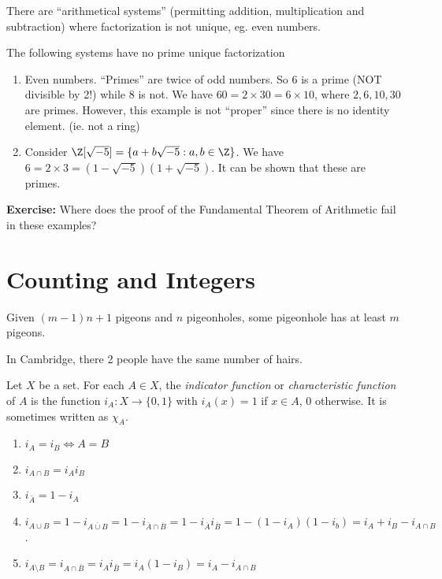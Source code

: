 \documentclass[a4paper]{article}
\begin{document}
  \note There are ``arithmetical systems'' (permitting addition, multiplication and subtraction) where factorization is not unique, eg. even numbers.

  \begin{eg}
    The following systems have no prime unique factorization
    \begin{enumerate}
      \item Even numbers. ``Primes'' are twice of odd numbers. So 6 is a prime (NOT divisible by 2!) while 8 is not. We have $60 = 2\times 30 = 6\times 10$, where $2, 6, 10, 30$ are primes. However, this example is not ``proper'' since there is no identity element. (ie. not a ring)
      \item Consider $\Z[\sqrt{-5}] = \{a + b\sqrt{-5} : a, b\in \Z\}$. We have $6 = 2\times 3 = (1 - \sqrt{-5})(1 + \sqrt{-5})$. It can be shown that these are primes.
    \end{enumerate}
  \end{eg}
  \noindent\textbf{Exercise:} Where does the proof of the Fundamental Theorem of Arithmetic fail in these examples?

  \section{Counting and Integers}
  \begin{thm}
    Given $(m - 1)n + 1$ pigeons and $n$ pigeonholes, some pigeonhole has at least $m$ pigeons.
  \end{thm}

  \begin{eg}
    In Cambridge, there 2 people have the same number of hairs.
  \end{eg}

  \begin{defi}
    Let $X$ be a set. For each $A\in X$, the \emph{indicator function} or \emph{characteristic function} of $A$ is the function $i_A: X\to \{0, 1\}$ with $i_A(x) = 1$ if $x\in A$, $0$ otherwise. It is sometimes written as $\chi_A$. 
  \end{defi}
  \begin{prop}\leavevmode
    \begin{enumerate}
      \item $i_A = i_B \Leftrightarrow A = B$
      \item $i_{A\cap B} = i_A i_B$
      \item $i_{\bar{A}} = 1 - i_A$
      \item $i_{A\cup B} = 1 - i_{\overline{A\cup B}}  = 1 - i_{\bar A\cap \bar B} = 1 - i_{\bar{A}}i_{\bar{B}} = 1 - (1 - i_A)(1 - i_b) = i_A + i_B - i_{A\cap B}$.
      \item $i_{A\setminus B} = i_{A\cap \bar B} = i_Ai_{\bar B} = i_A(1 - i_B) = i_A - i_{A\cap B}$
    \end{enumerate}
  \end{prop}
\end{document}
